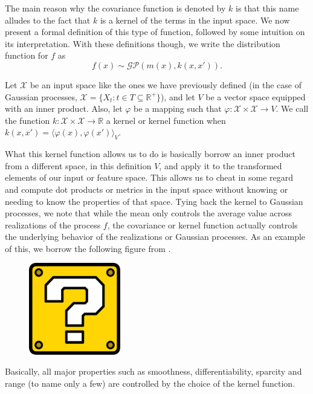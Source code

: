 The main reason why the covariance function is denoted by $k$ is that this name alludes to the fact that $k$ is a kernel of the terms in the input space. We now present a formal definition of this type of function, followed by some intuition on its interpretation. With these definitions though, we write the distribution function for $f$ as 
\[ f(x) \sim \mathcal{GP}(m(x), k(x,x')). \]

\begin{definition}
	Let $\mathcal{X}$ be an input space like the ones we have previously defined (in the case of Gaussian processes, $\mathcal{X} = \{ X_t : t \in T \subseteq \mathbb{R}^+ \}$), and let $V$ be a vector space equipped with an inner product. Also, let $\varphi$ be a mapping such that $\varphi: \mathcal{X} \times \mathcal{X} \rightarrow V$. We call the function $k: \mathcal{X} \times \mathcal{X} \rightarrow \mathbb{R}$ a kernel or kernel function when $k(x, x') = \langle \varphi (x), \varphi (x') \rangle_V$. 
\end{definition}

What this kernel function allows us to do is basically borrow an inner product from a different space, in this definition $V$, and apply it to the transformed elements of our input or feature space. This allows us to cheat in some regard and compute dot products or metrics in the input space without knowing or needing to know the properties of that space. Tying back the kernel to Gaussian processes, we note that while the mean only controls the average value across realizations of the process $f$, the covariance or kernel function actually controls the underlying behavior of the realizations or Gaussian processes. As an example of this, we borrow the following figure from \cite{ghahramani2011tutorial}. 

\begin{figure}[h]
	\includegraphics[width=4cm]{Figures/missing.png}
	\centering
	\label{trajectories}
\end{figure}

Basically, all major properties such as smoothness, differentiability, sparcity and range (to name only a few) are controlled by the choice of the kernel function. 

